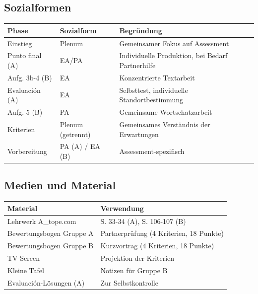 \documentclass[11pt, a4paper]{article}
\begin{document}
\subsection{Sozialformen}

\begin{center}
\begin{tabular}{|l|l|l|}
    \hline
    \textbf{Phase} & \textbf{Sozialform} & \textbf{Begründung} \\
    \hline
    Einstieg & Plenum & Gemeinsamer Fokus auf Assessment \\
    \hline
    Punto final (A) & EA/PA & Individuelle Produktion, bei Bedarf Partnerhilfe \\
    \hline
    Aufg. 3b-4 (B) & EA & Konzentrierte Textarbeit \\
    \hline
    Evaluación (A) & EA & Selbsttest, individuelle Standortbestimmung \\
    \hline
    Aufg. 5 (B) & PA & Gemeinsame Wortschatzarbeit \\
    \hline
    Kriterien & Plenum (getrennt) & Gemeinsames Verständnis der Erwartungen \\
    \hline
    Vorbereitung & PA (A) / EA (B) & Assessment-spezifisch \\
    \hline
\end{tabular}
\end{center}

\subsection{Medien und Material}

\begin{center}
\begin{tabular}{|l|l|}
    \hline
    \textbf{Material} & \textbf{Verwendung} \\
    \hline
    Lehrwerk A\_tope.com & S. 33-34 (A), S. 106-107 (B) \\
    \hline
    Bewertungsbogen Gruppe A & Partnerprüfung (4 Kriterien, 18 Punkte) \\
    \hline
    Bewertungsbogen Gruppe B & Kurzvortrag (4 Kriterien, 18 Punkte) \\
    \hline
    TV-Screen & Projektion der Kriterien \\
    \hline
    Kleine Tafel & Notizen für Gruppe B \\
    \hline
    Evaluación-Lösungen (A) & Zur Selbstkontrolle \\
    \hline
\end{tabular}
\end{center}
\end{document}
